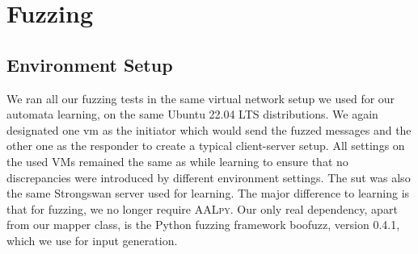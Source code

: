 %
%
% 
% 
% 

\chapter{Fuzzing}

\label{chap:Fuzzing}


\section{Environment Setup} \label{sec:fuzzenv}
We ran all our fuzzing tests in the same virtual network setup we used for our automata learning, on the same Ubuntu 22.04 LTS distributions. We again designated one \ac{vm} as the initiator which would send the fuzzed messages and the other one as the responder to create a typical client-server setup. All settings on the used VMs remained the same as while learning to ensure that no discrepancies were introduced by different environment settings. The \ac{sut} was also the same Strongswan server used for learning. The major difference to learning is that for fuzzing, we no longer require \textsc{AALpy}. Our only real dependency, apart from our mapper class, is the Python fuzzing framework boofuzz, version 0.4.1, which we use for input generation. 

